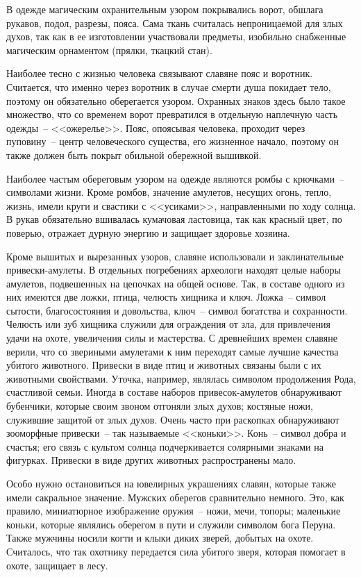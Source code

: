 \documentclass[pscyr,titlepage,chapters]{hedreport}
\begin{document}
  В одежде магическим охранительным узором покрывались ворот, обшлага рукавов,
  подол, разрезы, пояса. Сама ткань считалась непроницаемой для злых духов, так
  как в ее изготовлении участвовали предметы, изобильно снабженные магическим
  орнаментом (прялки, ткацкий стан).

  Наиболее тесно с жизнью человека связывают славяне пояс и воротник. Считается,
  что именно через воротник в случае смерти душа покидает тело, поэтому он
  обязательно оберегается узором. Охранных знаков здесь было такое множество,
  что со временем ворот превратился в отдельную наплечную часть одежды~--
  <<ожерелье>>. Пояс, опоясывая человека, проходит через пуповину~-- центр
  человеческого существа, его жизненное начало, поэтому он также должен быть
  покрыт обильной обережной вышивкой.

  Наиболее частым обереговым узором на одежде являются ромбы с крючками~--
  символами жизни. Кроме ромбов, значение амулетов, несущих огонь, тепло, жизнь,
  имели  круги и свастики с <<усиками>>, направленными по ходу солнца. В рукав
  обязательно вшивалась кумачовая ластовица, так как красный цвет, по поверью,
  отражает дурную энергию и защищает здоровье хозяина.

  Кроме вышитых и вырезанных узоров, славяне использовали и заклинательные
  привески-амулеты. В отдельных погребениях археологи находят целые наборы
  амулетов, подвешенных на цепочках на общей основе. Так, в составе одного из
  них имеются две ложки, птица, челюсть хищника и ключ. Ложка~-- символ сытости,
  благосостояния и довольства, ключ~-- символ богатства и сохранности. Челюсть
  или зуб хищника служили для ограждения от зла, для привлечения удачи на охоте,
  увеличения силы и мастерства. С древнейших времен славяне верили, что со
  звериными амулетами к ним переходят самые лучшие качества убитого животного.
  Привески в виде птиц и животных связаны были с их животными свойствами.
  Уточка, например, являлась символом продолжения Рода, счастливой семьи. Иногда
  в составе наборов привесок-амулетов обнаруживают бубенчики, которые своим
  звоном отгоняли злых духов; костяные ножи, служившие защитой от злых духов.
  Очень часто при раскопках обнаруживают зооморфные привески~-- так называемые
  <<коньки>>. Конь~-- символ добра и счастья; его связь с культом солнца
  подчеркивается солярными знаками на фигурках. Привески в виде других животных
  распространены мало.

  Особо нужно остановиться на ювелирных украшениях славян, которые также имели
  сакральное значение. Мужских оберегов сравнительно немного. Это, как правило,
  миниатюрное изображение оружия~-- ножи, мечи, топоры; маленькие коньки,
  которые являлись оберегом в пути и служили символом бога Перуна. Также мужчины
  носили когти и клыки диких зверей, добытых на охоте. Считалось, что так
  охотнику передается сила убитого зверя, которая помогает в охоте, защищает в
  лесу.
\end{document}
